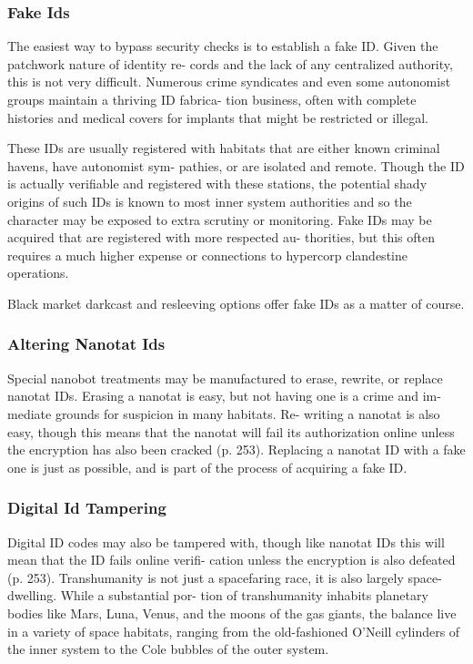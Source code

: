 \subsubsection{Fake Ids}

The easiest way to bypass security checks is to establish 
a fake ID. Given the patchwork nature of identity re-
cords and the lack of any centralized authority, this is 
not very difficult. Numerous crime syndicates and even 
some autonomist groups maintain a thriving ID fabrica-
tion business, often with complete histories and medical 
covers for implants that might be restricted or illegal. 

These IDs are usually registered with habitats that are 
either known criminal havens, have autonomist sym-
pathies, or are isolated and remote. Though the ID is 
actually verifiable and registered with these stations, the 
potential shady origins of such IDs is known to most 
inner system authorities and so the character may be 
exposed to extra scrutiny or monitoring. Fake IDs may 
be acquired that are registered with more respected au-
thorities, but this often requires a much higher expense 
or connections to hypercorp clandestine operations.

Black market darkcast and resleeving options offer 
fake IDs as a matter of course.

\subsubsection{Altering Nanotat Ids}

Special nanobot treatments may be manufactured 
to erase, rewrite, or replace nanotat IDs. Erasing a 
nanotat is easy, but not having one is a crime and im-
mediate grounds for suspicion in many habitats. Re-
writing a nanotat is also easy, though this means that 
the nanotat will fail its authorization online unless the 
encryption has also been cracked (p. 253). Replacing 
a nanotat ID with a fake one is just as possible, and is 
part of the process of acquiring a fake ID.

\subsubsection{Digital Id Tampering}

Digital ID codes may also be tampered with, though like 
nanotat IDs this will mean that the ID fails online verifi-
cation unless the encryption is also defeated (p. 253).
Transhumanity is not just a spacefaring race, it is 
also largely space-dwelling. While a substantial por-
tion of transhumanity inhabits planetary bodies like 
Mars, Luna, Venus, and the moons of the gas giants, 
the balance live in a variety of space habitats, ranging 
from the old-fashioned O'Neill cylinders of the inner 
system to the Cole bubbles of the outer system.

